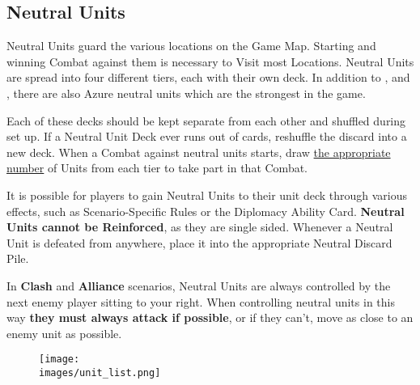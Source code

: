 \begin{multicols}{2}
\subsection*{Neutral Units}
Neutral Units guard the various locations on the Game Map.
Starting and winning Combat against them is necessary to Visit most Locations.
Neutral Units are spread into four different tiers, each with their own deck.
In addition to ,  and , there are also Azure  neutral units which are the strongest in the game.\par
Each of these decks should be kept separate from each other and shuffled during set up.
If a Neutral Unit Deck ever runs out of cards, reshuffle the discard into a new deck.
When a Combat against neutral units starts, draw \hyperlink{Difficulty}{the appropriate number} of Units from each tier to take part in that Combat.\par
It is possible for players to gain Neutral Units to their unit deck through various effects, such as Scenario-Specific Rules or the Diplomacy Ability Card.
\textbf{Neutral Units cannot be Reinforced}, as they are single sided.
Whenever a Neutral Unit is defeated from anywhere, place it into the appropriate Neutral Discard Pile.\par
In \textbf{Clash} and \textbf{Alliance} scenarios, Neutral Units are always controlled by the next enemy player sitting to your right.
When controlling neutral units in this way \textbf{they must always attack if possible}, or if they can't, move as close to an enemy unit as possible.\par

\end{multicols}

\begin{figure*}[!hb]
  \centering
  \texttt{[image: \\images/unit\_list.png]}
\end{figure*}
